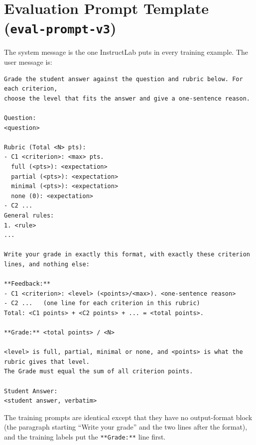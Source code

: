 \documentclass[11pt,a4paper]{article}
\theoremstyle{definition}
\begin{document}
\section{Evaluation Prompt Template (\texttt{eval-prompt-v3})}\label{app:prompt}
The system message is the one InstructLab puts in every training example. The user message is:
\begin{lstlisting}
Grade the student answer against the question and rubric below. For each criterion,
choose the level that fits the answer and give a one-sentence reason.

Question:
<question>

Rubric (Total <N> pts):
- C1 <criterion>: <max> pts.
  full (<pts>): <expectation>
  partial (<pts>): <expectation>
  minimal (<pts>): <expectation>
  none (0): <expectation>
- C2 ...
General rules:
1. <rule>
...

Write your grade in exactly this format, with exactly these criterion lines, and nothing else:

**Feedback:**
- C1 <criterion>: <level> (<points>/<max>). <one-sentence reason>
- C2 ...   (one line for each criterion in this rubric)
Total: <C1 points> + <C2 points> + ... = <total points>.

**Grade:** <total points> / <N>

<level> is full, partial, minimal or none, and <points> is what the rubric gives that level.
The Grade must equal the sum of all criterion points.

Student Answer:
<student answer, verbatim>
\end{lstlisting}
The training prompts are identical except that they have no output-format block (the paragraph starting ``Write your grade'' and the two lines after the format), and the training labels put the \texttt{**Grade:**} line first.
\end{document}
